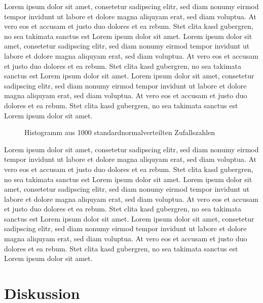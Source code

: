 \documentclass[
  11pt,
  a4paper,
]{tudscrreprt}
\begin{document}
Lorem ipsum dolor sit amet, consetetur sadipscing elitr, sed diam nonumy
eirmod tempor invidunt ut labore et dolore magna aliquyam erat, sed diam
voluptua. At vero eos et accusam et justo duo dolores et ea rebum. Stet
clita kasd gubergren, no sea takimata sanctus est Lorem ipsum dolor sit
amet. Lorem ipsum dolor sit amet, consetetur sadipscing elitr, sed diam
nonumy eirmod tempor invidunt ut labore et dolore magna aliquyam erat,
sed diam voluptua. At vero eos et accusam et justo duo dolores et ea
rebum. Stet clita kasd gubergren, no sea takimata sanctus est Lorem
ipsum dolor sit amet. Lorem ipsum dolor sit amet, consetetur sadipscing
elitr, sed diam nonumy eirmod tempor invidunt ut labore et dolore magna
aliquyam erat, sed diam voluptua. At vero eos et accusam et justo duo
dolores et ea rebum. Stet clita kasd gubergren, no sea takimata sanctus
est Lorem ipsum dolor sit amet.

\begin{figure}


\caption[1000 Zufallszahlen]{\label{fig-histogram}Histogramm aus 1000
standardnormalverteilten Zufallszahlen}

\end{figure}%

Lorem ipsum dolor sit amet, consetetur sadipscing elitr, sed diam nonumy
eirmod tempor invidunt ut labore et dolore magna aliquyam erat, sed diam
voluptua. At vero eos et accusam et justo duo dolores et ea rebum. Stet
clita kasd gubergren, no sea takimata sanctus est Lorem ipsum dolor sit
amet. Lorem ipsum dolor sit amet, consetetur sadipscing elitr, sed diam
nonumy eirmod tempor invidunt ut labore et dolore magna aliquyam erat,
sed diam voluptua. At vero eos et accusam et justo duo dolores et ea
rebum. Stet clita kasd gubergren, no sea takimata sanctus est Lorem
ipsum dolor sit amet. Lorem ipsum dolor sit amet, consetetur sadipscing
elitr, sed diam nonumy eirmod tempor invidunt ut labore et dolore magna
aliquyam erat, sed diam voluptua. At vero eos et accusam et justo duo
dolores et ea rebum. Stet clita kasd gubergren, no sea takimata sanctus
est Lorem ipsum dolor sit amet.

\chapter{Diskussion}\label{diskussion}
\end{document}

